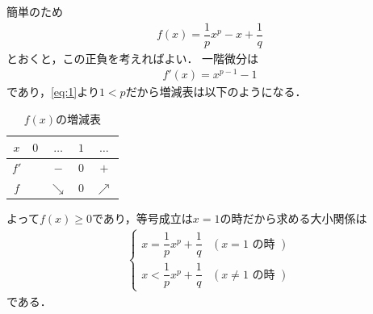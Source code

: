 \documentclass[../../main.tex]{subfiles}
\begin{document}
簡単のため
\begin{align}
  f(x) = \dfrac{1}{p}x^p - x + \dfrac{1}{q}
\end{align}
とおくと，この正負を考えればよい．
一階微分は
\begin{align}
  f'(x) = x^{p-1} - 1
\end{align}
であり，\cref{eq:1}より$1<p$だから増減表は以下のようになる．

\begin{table}[htb]
  \centering
  \caption{$f(x)$の増減表}
  \begin{tabular}{c|c*3{c}}
    $x$ & $0$ & $\dots$ & $1$ & $\dots$ \\ \hline
    $f'$ & & $-$ & $0$ & $+$ \\ \hline
    $f$ & & $\searrow$ & $0$ & $\nearrow$
  \end{tabular}
\end{table}

よって$f(x)\ge 0$であり，等号成立は$x=1$の時だから求める大小関係は
\begin{align}
  \begin{cases}
    x = \dfrac{1}{p}x^p + \dfrac{1}{q} & \left(x = 1 \text{ の時 }\right) \\[10pt]
    x < \dfrac{1}{p}x^p + \dfrac{1}{q} & \left(x \ne 1 \text{ の時 }\right)
  \end{cases}
\end{align}
である．
\end{document}
